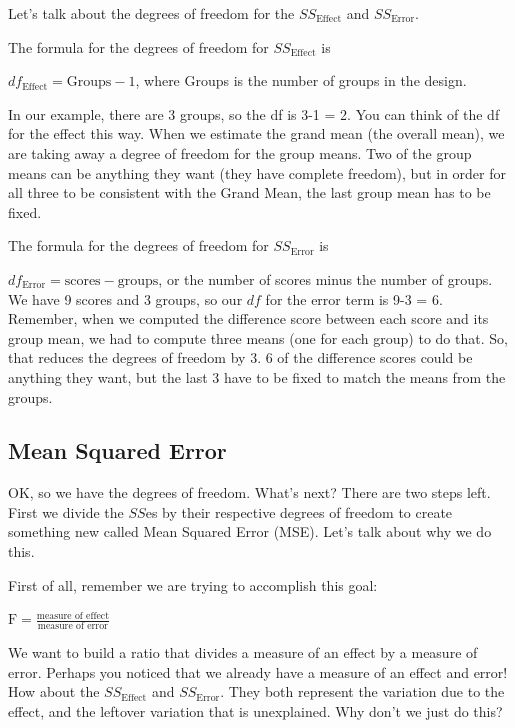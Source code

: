 \documentclass[
]{book}
\begin{document}
Let's talk about the degrees of freedom for the \(SS_\text{Effect}\) and \(SS_\text{Error}\).

The formula for the degrees of freedom for \(SS_\text{Effect}\) is

\(df_\text{Effect} = \text{Groups} -1\), where Groups is the number of groups in the design.

In our example, there are 3 groups, so the df is 3-1 = 2. You can think of the df for the effect this way. When we estimate the grand mean (the overall mean), we are taking away a degree of freedom for the group means. Two of the group means can be anything they want (they have complete freedom), but in order for all three to be consistent with the Grand Mean, the last group mean has to be fixed.

The formula for the degrees of freedom for \(SS_\text{Error}\) is

\(df_\text{Error} = \text{scores} - \text{groups}\), or the number of scores minus the number of groups. We have 9 scores and 3 groups, so our \(df\) for the error term is 9-3 = 6. Remember, when we computed the difference score between each score and its group mean, we had to compute three means (one for each group) to do that. So, that reduces the degrees of freedom by 3. 6 of the difference scores could be anything they want, but the last 3 have to be fixed to match the means from the groups.

\subsection{Mean Squared Error}\label{mean-squared-error}

OK, so we have the degrees of freedom. What's next? There are two steps left. First we divide the \(SS\)es by their respective degrees of freedom to create something new called Mean Squared Error (MSE). Let's talk about why we do this.

First of all, remember we are trying to accomplish this goal:

\(\text{F} = \frac{\text{measure of effect}}{\text{measure of error}}\)

We want to build a ratio that divides a measure of an effect by a measure of error. Perhaps you noticed that we already have a measure of an effect and error! How about the \(SS_\text{Effect}\) and \(SS_\text{Error}\). They both represent the variation due to the effect, and the leftover variation that is unexplained. Why don't we just do this?
\end{document}
